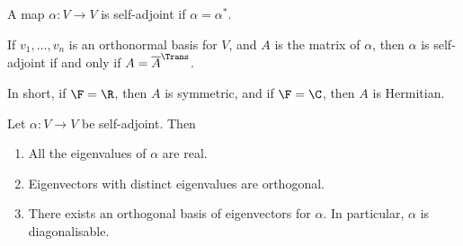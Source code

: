 \begin{definition}
	A map $\alpha:V\to V$ is self-adjoint if $\alpha=\alpha^*$. 
\end{definition}


If $v_1,\ldots,v_n$ is an orthonormal basis for $V$, and $A$ is the matrix of $\alpha$, then $\alpha$ is self-adjoint if and only if $A=\overline{A}^\Trans$. %
	
In short, if $\F=\R$, then $A$ is symmetric, and if $\F=\C$, then $A$ is Hermitian.

	\pagebreak

\begin{theorem}
	Let $\alpha:V\to V$ be self-adjoint. Then %
	\begin{enumerate}
		\shortskip
		\item All the eigenvalues of $\alpha$ are real.
		\item Eigenvectors with distinct eigenvalues are orthogonal.
		\item There exists an orthogonal basis of eigenvectors for $\alpha$. In particular, $\alpha$ is diagonalisable. %
	\end{enumerate}
\end{theorem}

\vspace{-3pt}

